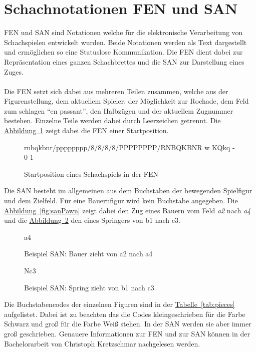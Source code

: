 \section{Schachnotationen FEN und SAN}
\gls{FEN} und \gls{SAN} sind Notationen welche für die elektronische Verarbeitung von Schachspielen entwickelt wurden. Beide Notationen werden als Text dargestellt und ermöglichen so eine Statuslose Kommunikation. Die \gls{FEN} dient dabei zur Repräsentation eines ganzen Schachbrettes und die \gls{SAN} zur Darstellung eines Zuges.\\
\\
Die \gls{FEN} setzt sich dabei aus mehreren Teilen zusammen, welche aus der Figurenstellung, dem aktuellem Spieler, der Möglichkeit zur Rochade, dem Feld zum schlagen \enquote{en passant}, den Halbzügen und der aktuellem Zugnummer bestehen. Einzelne Teile werden dabei durch Leerzeichen getrennt. Die \hyperref[fig:fen]{Abbildung~\ref{fig:fen}} zeigt dabei die \gls{FEN} einer Startposition.\\

\begin{figure}[H]
	\caption{Startposition eines Schachspiels in der FEN}
	rnbqkbnr/pppppppp/8/8/8/8/PPPPPPPP/RNBQKBNR w KQkq - 0 1
	\label{fig:fen}
\end{figure}\noindent
Die \gls{SAN} besteht im allgemeinen aus dem Buchstaben der bewegenden Spielfigur und dem Zielfeld. Für eine Bauernfigur wird kein Buchstabe angegeben. Die \hyperref[fig:sanPawn]{Abbildung~\ref{fig:sanPawn}} zeigt dabei den Zug eines Bauern vom Feld \textit{a2} nach \textit{a4} und die \hyperref[fig:ig:sanKnight]{Abbildung~\ref{fig:sanKnight}} den eines Springers von b1 nach c3.\\

\begin{figure}[H]
	\begin{minipage}[b]{.5\linewidth}
		\centering
		a4
		\captionsetup{justification=centering}
		\caption{Beispiel SAN: Bauer zieht von a2 nach a4}\label{fig:sanPawn}
	\end{minipage}%
	\begin{minipage}[b]{.5\linewidth}
		\centering
		Nc3
		\captionsetup{justification=centering}
		\caption{Beispiel SAN: Spring zieht von b1 nach c3}\label{fig:sanKnight}
	\end{minipage}
\end{figure}\noindent
Die Buchstabencodes der einzelnen Figuren sind in der \hyperref[tab:pieces]{Tabelle~\ref{tab:pieces}} aufgelistet. Dabei ist zu beachten das die Codes kleingeschrieben für die Farbe Schwarz und groß für die Farbe Weiß stehen. In der \gls{SAN} werden sie aber immer groß geschrieben. Genauere Informationen zur \gls{FEN} und zur \gls{SAN} können in der Bachelorarbeit \cite[9-10]{kretzschmar} von Christoph Kretzschmar nachgelesen werden.

